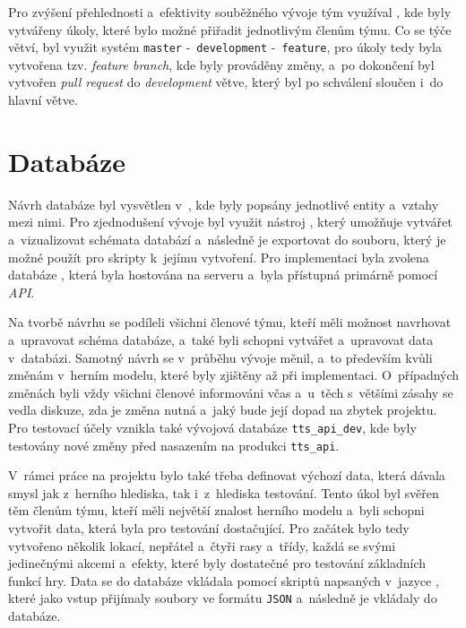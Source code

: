 Pro zvýšení přehlednosti a~efektivity souběžného vývoje tým využíval , kde byly vytvářeny úkoly, které bylo možné přiřadit jednotlivým členům týmu. Co se týče větví, byl využit systém \texttt{master} -~\texttt{development} -~\texttt{feature}, pro úkoly tedy byla vytvořena tzv. \textit{feature branch}, kde byly prováděny změny, a~po dokončení byl vytvořen \textit{pull request} do \textit{development} větve, který byl po schválení sloučen i~do hlavní větve.

\section{Databáze}
\label{subsec:database}

Návrh databáze byl vysvětlen v~, kde byly popsány jednotlivé entity a~vztahy mezi nimi. Pro zjednodušení vývoje byl využit nástroj , který umožňuje vytvářet a~vizualizovat schémata databází a~následně je exportovat do souboru, který je možné použít pro skripty k~jejímu vytvoření. Pro implementaci byla zvolena databáze , která byla hostována na serveru a~byla přístupná primárně pomocí \textit{API}.

Na tvorbě návrhu se podíleli všichni členové týmu, kteří měli možnost navrhovat a~upravovat schéma databáze, a~také byli schopni vytvářet a~upravovat data v~databázi. Samotný návrh se v~průběhu vývoje měnil, a~to především kvůli změnám v~herním modelu, které byly zjištěny až při implementaci. O~případných změnách byli vždy všichni členové informováni včas a~u~těch s~většími zásahy se vedla diskuze, zda je změna nutná a~jaký bude její dopad na zbytek projektu. Pro testovací účely vznikla také vývojová databáze \texttt{tts\_api\_dev}, kde byly testovány nové změny před nasazením na produkci \texttt{tts\_api}.

V~rámci práce na projektu bylo také třeba definovat výchozí data, která dávala smysl jak z~herního hlediska, tak i~z~hlediska testování. Tento úkol byl svěřen těm členům týmu, kteří měli největší znalost herního modelu a~byli schopni vytvořit data, která byla pro testování dostačující. Pro začátek bylo tedy vytvořeno několik lokací, nepřátel a~čtyři rasy a~třídy, každá se svými jedinečnými akcemi a~efekty, které byly dostatečné pro testování základních funkcí hry. Data se do databáze vkládala pomocí skriptů napsaných v~jazyce , které jako vstup přijímaly soubory ve formátu \texttt{JSON} a~následně je vkládaly do databáze.

